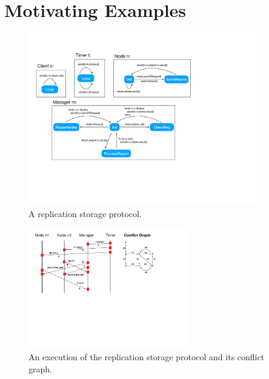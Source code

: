 \section{Motivating Examples}\label{asec:motivation}

\begin{figure}[t]
\includegraphics[width=10cm]{replication.pdf}
\caption{A replication storage protocol.}
\label{fig:replication}
\end{figure}

\begin{figure}[t]
\includegraphics[width=7cm]{MSC-storage.pdf}
\caption{An execution of the replication storage protocol and its conflict graph.}
\label{fig:replic-exec}
\end{figure}


